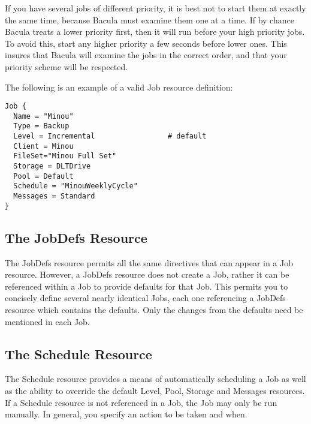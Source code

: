 \begin{description}
If you have several jobs of different priority, it is best  not to start them
at exactly the same time, because Bacula  must examine them one at a time. If
by chance Bacula treats  a lower priority first, then it will run before your
high  priority jobs. To avoid this, start any higher priority  a few seconds
before lower ones. This insures that Bacula  will examine the jobs in the
correct order, and that your  priority scheme will be respected.  

\end{description}

The following is an example of a valid Job resource definition: 

\footnotesize
\begin{verbatim}
Job {
  Name = "Minou"
  Type = Backup
  Level = Incremental                 # default
  Client = Minou
  FileSet="Minou Full Set"
  Storage = DLTDrive
  Pool = Default
  Schedule = "MinouWeeklyCycle"
  Messages = Standard
}
\end{verbatim}
\normalsize

\subsection*{The JobDefs Resource}
\label{JobDefsResource}

The JobDefs resource permits all the same directives that can appear in a Job
resource. However, a JobDefs resource does not create a Job, rather it can be
referenced within a Job to provide defaults for that Job. This permits you to
concisely define several nearly identical Jobs, each one referencing a JobDefs
resource which contains the defaults. Only the changes from the defaults need
be mentioned in each Job. 

\subsection*{The Schedule Resource}
\label{ScheduleResource}

The Schedule resource provides a means of automatically scheduling a Job as
well as the ability to override the default Level, Pool, Storage and Messages
resources. If a Schedule resource is not referenced in a Job, the Job may only
be run manually. In general, you specify an action to be taken and when. 

